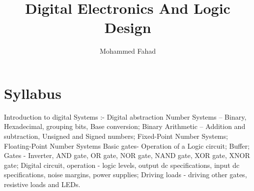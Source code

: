 \documentclass{article}
\title{Digital Electronics And Logic Design}
\author{Mohammed Fahad}
\begin{document}
\maketitle

\section{Syllabus}

Introduction to digital Systems :- Digital abstraction
Number Systems – Binary, Hexadecimal, grouping bits, Base conversion;
Binary Arithmetic – Addition and subtraction, Unsigned and Signed
numbers; Fixed-Point Number Systems; Floating-Point Number Systems
Basic gates- Operation of a Logic circuit; Buffer; Gates - Inverter, AND gate,
OR gate, NOR gate, NAND gate, XOR gate, XNOR gate; Digital circuit,
operation - logic levels, output dc specifications, input dc specifications,
noise margins, power supplies; Driving loads - driving other gates, resistive
loads and LEDs.
\end{document}
